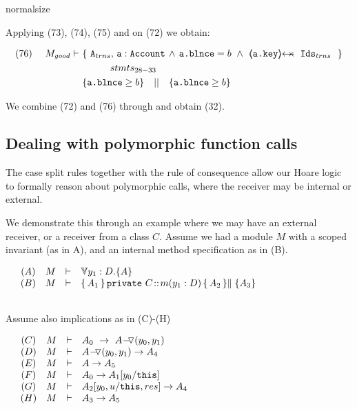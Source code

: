 \begin{proofO}
normalsize

Applying (73), (74), (75) and {} on (72) we obtain:

\small
 \begin{align*}
 \text{(76)}  \ \ \ \ M_{good} \vdash  \ 
		&	\{  \ \Alocalstr, \, \prg{a}:\prg{Account}\, \wedge\,  \prg{a.\balance}=b\ \wedge \ \protectedFrom {\prg{a.key}} {\Idstr}\ \  \} \\
		&  \SPT   stmts_{28-33} \\
		& \{ \prg{a.\balance}\geq b \} \ \ \  || \ \ \  \{ \prg{a.\balance}\geq b \}
\end{align*}
\normalsize

We combine  (72) and (76) through {} and obtain (32).

\end{proofO}

\subsection{Dealing with polymorphic function calls}
\label{app:polymorphic}

The case split rules together with the rule of consequence allow our Hoare logic to formally reason about polymorphic calls, where the receiver may be internal or external.

We demonstrate this through an example where we may have an external receiver, or a receiver from a class $C$. Assume we had a module $M$ with a scoped invariant (as in A), and an internal method specification as in (B). 

$\begin{array}{lclcl}
& (A)& M & \vdash & \TwoStatesN{y_1:D}{A} \\
& (B) & M & \vdash & \mprepostLong {A_1}{ \prg{private}\ C} {m}   {y_1: D} {A_2} { \parallel \{A_3\}}  \\
\\
  \end{array}
$

Assume also implications as in (C)-(H)

$\begin{array}{lclcl}
&  (C) & M & \vdash & A_0 \ \rightarrow \ \PushASLong {(y_0,y_1)}{A}\\
&  (D) & M & \vdash &  \PushASLong {(y_0,y_1)}{A} \rightarrow A_4\\
 & (E) &  M & \vdash & A \rightarrow A_5\\
  & (F) &  M & \vdash & A_0 \rightarrow A_1[y_0/\prg{this}]\\
  & (G) &  M & \vdash & A_2[y_0,u/\prg{this},res] \rightarrow A_4 \\
    & (H) &  M & \vdash & A_3  \rightarrow A_5 
\\
  \end{array}
$

